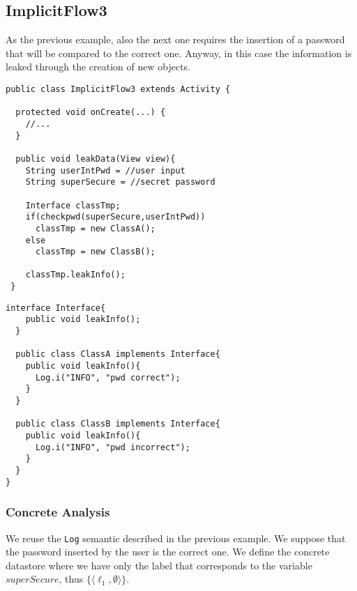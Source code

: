 \documentclass{llncs}
\begin{document}
\subsection{ImplicitFlow3}
As the previous example, also the next one requires the insertion of a password that will be compared to the correct one. Anyway, in this case the information is leaked through the creation of new objects.

\begin{center}
\begin{multicols}{2}
\begin{lstlisting}[basicstyle=\sffamily\scriptsize]
public class ImplicitFlow3 extends Activity {

  protected void onCreate(...) {
    //...
  }

  public void leakData(View view){
    String userIntPwd = //user input
    String superSecure = //secret password
  		
    Interface classTmp;
    if(checkpwd(superSecure,userIntPwd))
      classTmp = new ClassA();
    else
      classTmp = new ClassB();
  		
    classTmp.leakInfo();
 }
\end{lstlisting}
\vfill\columnbreak

\begin{lstlisting}[firstnumber=19, basicstyle=\sffamily\scriptsize]
  interface Interface{
    public void leakInfo();
  }
  	
  public class ClassA implements Interface{
  	public void leakInfo(){
  	  Log.i("INFO", "pwd correct");
  	}
  }
  	
  public class ClassB implements Interface{
  	public void leakInfo(){
  	  Log.i("INFO", "pwd incorrect");
  	}
  }
}
\end{lstlisting}
\end{multicols}
\end{center}

\subsubsection{Concrete Analysis}
We reuse the \texttt{Log} semantic described in the previous example. We suppose that the password inserted by the user is the correct one. We define the concrete datastore where we have only the label that corresponds to the variable $superSecure$, thus $\{\langle \ell_1, \emptyset \rangle\}$.
\end{document}
